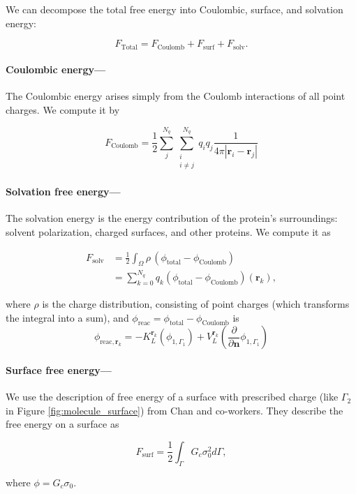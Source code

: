 
We can decompose the total free energy into Coulombic, surface, and solvation energy:

\begin{equation}
F_\text{Total} = F_\text{Coulomb} + F_\text{surf} + F_\text{solv}.
\end{equation}

\medskip

\paragraph*{Coulombic energy---}

The Coulombic energy arises simply from the Coulomb interactions of all point charges. We compute it by

\begin{equation} \label{eq:coul_energy}
F_\text{Coulomb} = \frac{1}{2} \sum_j^{N_q}\sum^{N_q}_{\substack{i\\ i\neq j}} q_iq_j\frac{1}{4\pi |\mathbf{r}_i-\mathbf{r}_j|}
\end{equation}

\paragraph*{Solvation free energy---}

The solvation energy is the energy contribution of the protein's surroundings: solvent polarization, charged surfaces, and other proteins. We compute it as

\begin{align} \label{eq:solv_energy}
F_{\text{solv}} &= \frac{1}{2} \int_{\Omega} \rho \,(\phi_{\text{total}} - \phi_{\text{Coulomb}}) \\
&= \sum_{k=0}^{N_q} q_k (\phi_{\text{total}} - \phi_{\text{Coulomb}})(\mathbf{r}_k),
\end{align}

\noindent where $\rho$ is the charge distribution, consisting of point charges (which transforms the integral into a sum), and $\phi_\text{reac} = \phi_{\text{total}} - \phi_{\text{Coulomb}}$ is
%
\begin{equation} \label{eq:phi_reac_bem}
\phi_{\text{reac},\mathbf{r}_k} = -K_{L}^{\mathbf{r}_k}(\phi_{1,\Gamma_1}) + V_{L}^{\mathbf{r}_k} \left(\frac{\partial}{\partial \mathbf{n}}\phi_{1,\Gamma_1} \right) 
\end{equation}

\paragraph*{Surface free energy---}

We use the description of free energy of a surface with prescribed charge (like $\Gamma_2$ in Figure \ref{fig:molecule_surface}) from Chan and co-workers.\cite{ChanMitchell1983,CarnieChan1993} They describe the free energy on a surface as

\begin{equation} \label{eq:energy_surf}
F_\text{surf} = \frac{1}{2} \int_{\Gamma} G_c \sigma_0^2 d\Gamma, 
\end{equation} 

\noindent where $\phi = G_c \sigma_0$.
